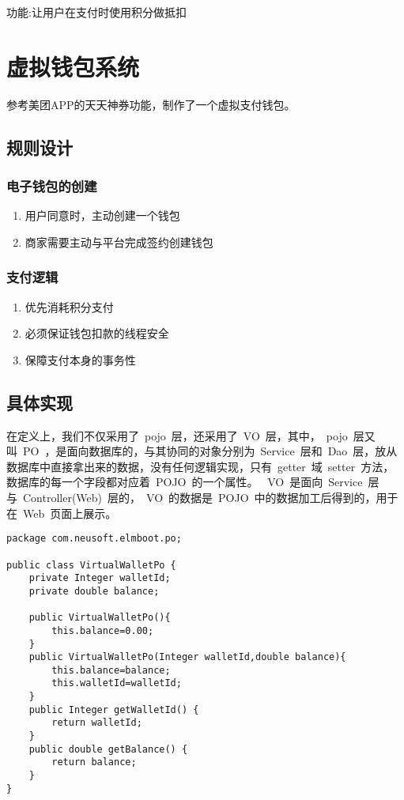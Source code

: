 功能:让用户在支付时使用积分做抵扣

\section{虚拟钱包系统}
参考美团APP的天天神券功能，制作了一个虚拟支付钱包。
\subsection{规则设计}
\subsubsection{电子钱包的创建}
\begin{enumerate}
	\item 用户同意时，主动创建一个钱包
	\item 商家需要主动与平台完成签约创建钱包
\end{enumerate}
\subsubsection{支付逻辑}
\begin{enumerate}
	\item 优先消耗积分支付
	\item 必须保证钱包扣款的线程安全
	\item 保障支付本身的事务性
\end{enumerate}
\subsection{具体实现}
在定义上，我们不仅采用了~pojo~层，还采用了~VO~层，其中，~pojo~层又叫~PO~，是面向数据库的，与其协同的对象分别为~Service~层和~Dao~层，放从数据库中直接拿出来的数据，没有任何逻辑实现，只有~getter~域~setter~方法，数据库的每一个字段都对应着~POJO~的一个属性。
~VO~是面向~Service~层与~Controller(Web)~层的，~VO~的数据是~POJO~中的数据加工后得到的，用于在~Web~页面上展示。

\begin{lstlisting}[basicstyle=\footnotesize]
package com.neusoft.elmboot.po;

public class VirtualWalletPo {
	private Integer walletId;
	private double balance;

	public VirtualWalletPo(){
		this.balance=0.00;
	}
	public VirtualWalletPo(Integer walletId,double balance){
		this.balance=balance;
		this.walletId=walletId;
	}
	public Integer getWalletId() {
		return walletId;
	}
	public double getBalance() {
		return balance;
	}
}
\end{lstlisting}

